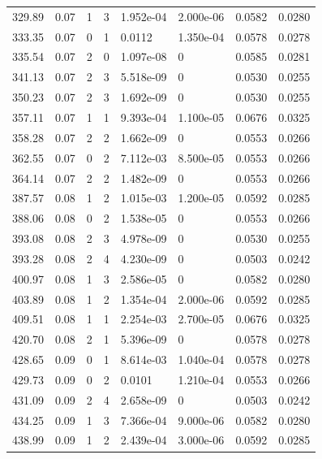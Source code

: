 \documentclass[preview]{standalone}
\begin{document}
{{{\begin{tabular}{L{1.2cm}C{1.2cm} C{0.3cm}C{0.5cm} C{1.4cm}C{1.4cm} C{1.4cm}C{1.4cm}}
  329.89  &  0.07  & 1     &  3 &  1.952e-04  & 2.000e-06  & 0.0582 &  0.0280   \\ 
  333.35  &  0.07  & 0     &  1 &  0.0112  & 1.350e-04  & 0.0578 &  0.0278   \\ 
  335.54  &  0.07  & 2     &  0 &  1.097e-08  & 0  & 0.0585 &  0.0281   \\ 
  341.13  &  0.07  & 2     &  3 &  5.518e-09  & 0  & 0.0530 &  0.0255   \\ 
  350.23  &  0.07  & 2     &  3 &  1.692e-09  & 0  & 0.0530 &  0.0255   \\ 
  357.11  &  0.07  & 1     &  1 &  9.393e-04  & 1.100e-05  & 0.0676 &  0.0325   \\ 
  358.28  &  0.07  & 2     &  2 &  1.662e-09  & 0  & 0.0553 &  0.0266   \\ 
  362.55  &  0.07  & 0     &  2 &  7.112e-03  & 8.500e-05  & 0.0553 &  0.0266   \\ 
  364.14  &  0.07  & 2     &  2 &  1.482e-09  & 0  & 0.0553 &  0.0266   \\ 
  387.57  &  0.08  & 1     &  2 &  1.015e-03  & 1.200e-05  & 0.0592 &  0.0285   \\ 
  388.06  &  0.08  & 0     &  2 &  1.538e-05  & 0  & 0.0553 &  0.0266   \\ 
  393.08  &  0.08  & 2     &  3 &  4.978e-09  & 0  & 0.0530 &  0.0255   \\ 
  393.28  &  0.08  & 2     &  4 &  4.230e-09  & 0  & 0.0503 &  0.0242   \\ 
  400.97  &  0.08  & 1     &  3 &  2.586e-05  & 0  & 0.0582 &  0.0280   \\ 
  403.89  &  0.08  & 1     &  2 &  1.354e-04  & 2.000e-06  & 0.0592 &  0.0285   \\ 
  409.51  &  0.08  & 1     &  1 &  2.254e-03  & 2.700e-05  & 0.0676 &  0.0325   \\ 
  420.70  &  0.08  & 2     &  1 &  5.396e-09  & 0  & 0.0578 &  0.0278   \\ 
  428.65  &  0.09  & 0     &  1 &  8.614e-03  & 1.040e-04  & 0.0578 &  0.0278   \\ 
  429.73  &  0.09  & 0     &  2 &  0.0101  & 1.210e-04  & 0.0553 &  0.0266   \\ 
  431.09  &  0.09  & 2     &  4 &  2.658e-09  & 0  & 0.0503 &  0.0242   \\ 
  434.25  &  0.09  & 1     &  3 &  7.366e-04  & 9.000e-06  & 0.0582 &  0.0280   \\ 
  438.99  &  0.09  & 1     &  2 &  2.439e-04  & 3.000e-06  & 0.0592 &  0.0285   \\ 

\end{tabular}}}}
\end{document}
